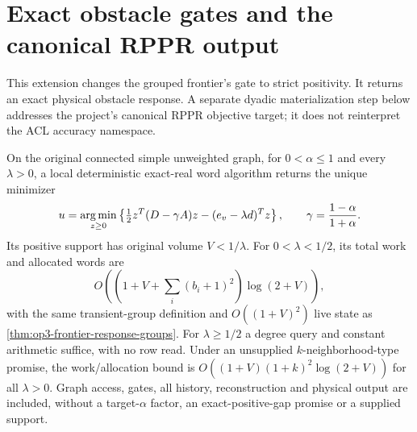 \section{Exact obstacle gates and the canonical RPPR output}
\label{sec:op3-exact-group-obstacle}

This extension changes the grouped frontier's gate to strict positivity.
It returns an exact physical obstacle response. A separate dyadic
materialization step below addresses the project's canonical RPPR
objective target; it does not reinterpret the ACL accuracy namespace.

\begin{theorem}
\label{thm:op3-exact-group-obstacle}
On the original connected simple unweighted graph, for $0<\alpha\leq1$
and every $\lambda>0$, a local deterministic exact-real word algorithm
returns the unique minimizer
\[
 u=\operatorname*{arg\,min}_{z\geq0}\left\{
 \tfrac12 z^T(D-\gamma A)z-(e_v-\lambda d)^Tz\right\},
 \qquad \gamma=\frac{1-\alpha}{1+\alpha}.
\]
Its positive support has original volume $V<1/\lambda$. For
$0<\lambda<1/2$, its total work and allocated words are
\[
 O\left(\left(1+V+\sum_i(b_i+1)^2\right)\log(2+V)\right),
\]
with the same transient-group definition and $O((1+V)^2)$ live state as
\cref{thm:op3-frontier-response-groups}. For $\lambda\geq1/2$ a degree
query and constant arithmetic suffice, with no row read. Under an
unsupplied $k$-neighborhood-type promise, the work/allocation bound is
$O((1+V)(1+k)^2\log(2+V))$ for all $\lambda>0$. Graph access, gates,
all history, reconstruction and physical output are included, without a
target-$\alpha$ factor, an exact-positive-gap promise or a supplied support.
\end{theorem}
